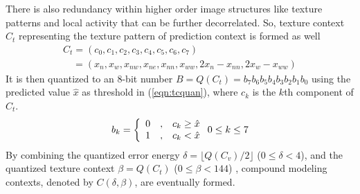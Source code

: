 \documentclass[journal]{IEEEtran}
\begin{document}
There is also redundancy within higher order image structures like texture patterns and local
activity that can be further decorrelated. So, texture context $C_t$ representing the texture
pattern of prediction context is formed as well
\begin{equation}\label{eqn:textcon}
\begin{array}{l}
    C_t = (c_0, c_1, c_2, c_3, c_4, c_5, c_6, c_7) \\
     \quad = (x_n, x_w, x_{nw}, x_{ne}, x_{nn}, x_{ww},2x_n - x_{nn}, 2x_w - x_{ww})
\end{array}
\end{equation}
It is then quantized to an 8-bit number $B=Q(C_t)=b_7b_6b_5b_4b_3b_2b_1b_0$ using the predicted
value $\hat{x}$ as threshold in (\ref{eqn:tcquan}), where $c_k$ is the $k$th component of $C_t$.
\begin{equation}\label{eqn:tcquan}
    b_k = \left\{ \begin{array}{l@{\quad,\quad}l}
	0 & c_k \ge \hat{x} \\
	1 & c_k < \hat{x}
    \end{array}\right. 
    0 \le k \le 7
\end{equation}
By combining the quantized error energy $\delta = \lfloor Q(C_v)/2 \rfloor$ ($0 \le \delta < 4$),
and the quantized texture context $\beta = Q(C_t)$ ($0 \le \beta < 144$) \cite{Wu97calic2}, compound
modeling contexts, denoted by $C(\delta, \beta)$, are eventually formed.
\end{document}

